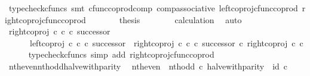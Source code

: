\begin{isabellebody}
\ {\isacharparenleft}{\kern0pt}typecheck{\isacharunderscore}{\kern0pt}cfuncs{\isacharcomma}{\kern0pt}\ smt\ cfunc{\isacharunderscore}{\kern0pt}coprod{\isacharunderscore}{\kern0pt}comp\ comp{\isacharunderscore}{\kern0pt}associative{}\ left{\isacharunderscore}{\kern0pt}coproj{\isacharunderscore}{\kern0pt}cfunc{\isacharunderscore}{\kern0pt}coprod\ right{\isacharunderscore}{\kern0pt}coproj{\isacharunderscore}{\kern0pt}cfunc{\isacharunderscore}{\kern0pt}coprod{\isacharparenright}{\kern0pt}\isanewline
\ \ \ \ \isamarkupfalse%
\ \isamarkupfalse%
\ {\isacharquery}{\kern0pt}thesis\isanewline
\ \ \ \ \ \ \isamarkupfalse%
\ calculation\ \isamarkupfalse%
\ auto\isanewline
\ \ \isamarkupfalse%
\isanewline
\isanewline
\ \ \isamarkupfalse%
\ {\isachardoublequoteopen}right{\isacharunderscore}{\kern0pt}coproj\ {\isasymnat}\isactrlsub c\ {\isasymnat}\isactrlsub c\ {\isasymcirc}\isactrlsub c\ successor\ {\isacharequal}{\kern0pt}\isanewline
\ \ \ \ \ \ {\isacharparenleft}{\kern0pt}left{\isacharunderscore}{\kern0pt}coproj\ {\isasymnat}\isactrlsub c\ {\isasymnat}\isactrlsub c\ {\isasymcirc}\isactrlsub c\ successor{\isacharparenright}{\kern0pt}\ {\isasymamalg}\ {\isacharparenleft}{\kern0pt}right{\isacharunderscore}{\kern0pt}coproj\ {\isasymnat}\isactrlsub c\ {\isasymnat}\isactrlsub c\ {\isasymcirc}\isactrlsub c\ successor{\isacharparenright}{\kern0pt}\ {\isasymcirc}\isactrlsub c\ right{\isacharunderscore}{\kern0pt}coproj\ {\isasymnat}\isactrlsub c\ {\isasymnat}\isactrlsub c{\isachardoublequoteclose}\isanewline
\ \ \ \ \isamarkupfalse%
\ {\isacharparenleft}{\kern0pt}typecheck{\isacharunderscore}{\kern0pt}cfuncs{\isacharcomma}{\kern0pt}\ simp\ add{\isacharcolon}{\kern0pt}\ right{\isacharunderscore}{\kern0pt}coproj{\isacharunderscore}{\kern0pt}cfunc{\isacharunderscore}{\kern0pt}coprod{\isacharparenright}{\kern0pt}\isanewline
{}\isamarkupfalse%
%
\endisatagproof
{\isafoldproof}%
%
\isadelimproof
\isanewline
%
\endisadelimproof
\isanewline
{}\isamarkupfalse%
\ nth{\isacharunderscore}{\kern0pt}even{\isacharunderscore}{\kern0pt}nth{\isacharunderscore}{\kern0pt}odd{\isacharunderscore}{\kern0pt}halve{\isacharunderscore}{\kern0pt}with{\isacharunderscore}{\kern0pt}parity{\isacharcolon}{\kern0pt}\isanewline
\ \ {\isachardoublequoteopen}{\isacharparenleft}{\kern0pt}nth{\isacharunderscore}{\kern0pt}even\ {\isasymamalg}\ nth{\isacharunderscore}{\kern0pt}odd{\isacharparenright}{\kern0pt}\ {\isasymcirc}\isactrlsub c\ halve{\isacharunderscore}{\kern0pt}with{\isacharunderscore}{\kern0pt}parity\ {\isacharequal}{\kern0pt}\ id\ {\isasymnat}\isactrlsub c{\isachardoublequoteclose}\isanewline

\end{isabellebody}
